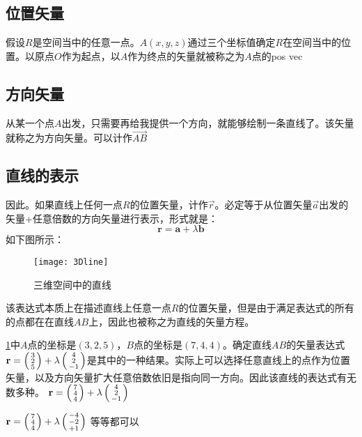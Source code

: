 \subsection*{位置矢量}
假设$R$是空间当中的任意一点。$A(x,y,z)$通过三个坐标值确定$R$在空间当中的位置。以原点$O$作为起点，以$A$作为终点的矢量就被称之为$A$点的\gls{pos vec}

\subsection*{方向矢量}
从某一个点$A$出发，只需要再给我提供一个方向，就能够绘制一条直线了。该矢量就称之为方向矢量。可以计作$\overrightarrow{AB}$


\subsection*{直线的表示}
因此。如果直线上任何一点$R$的位置矢量，计作$\vec{r}$。必定等于从位置矢量$\vec{a}$出发的矢量+任意倍数的方向矢量进行表示，形式就是：
\[
	\textbf{r} = \textbf{a}+\lambda \textbf{b}
\]
如下图所示：
\begin{figure}[H]
\centering
\texttt{[image: 3Dline]}
\label{fig:3Dline}
\caption{三维空间中的直线}
\end{figure}

该表达式本质上在描述直线上任意一点$R$的位置矢量，但是由于满足表达式的所有的点都在在直线$AB$上，因此也被称之为直线的矢量方程。

\begin{TaskBox}
\ref{fig:3Dline}中$A$点的坐标是$(3,2,5)$，$B$点的坐标是$(7,4,4)$。确定直线$AB$的矢量表达式
\tcblower
$\textbf{r} = \left(\begin{smallmatrix}3\\2\\5\end{smallmatrix}\right) +\lambda \left(\begin{smallmatrix}4\\2\\-1\end{smallmatrix}\right)$是其中的一种结果。实际上可以选择任意直线上的点作为位置矢量，以及方向矢量扩大任意倍数依旧是指向同一方向。因此该直线的表达式有无数多种。
$\textbf{r} = \left(\begin{smallmatrix}7\\4\\4\end{smallmatrix}\right) +\lambda \left(\begin{smallmatrix}4\\2\\-1\end{smallmatrix}\right)$

$\textbf{r} = \left(\begin{smallmatrix}7\\4\\4\end{smallmatrix}\right) +\lambda \left(\begin{smallmatrix}-4\\-2\\+1\end{smallmatrix}\right)$
等等都可以
\end{TaskBox}

